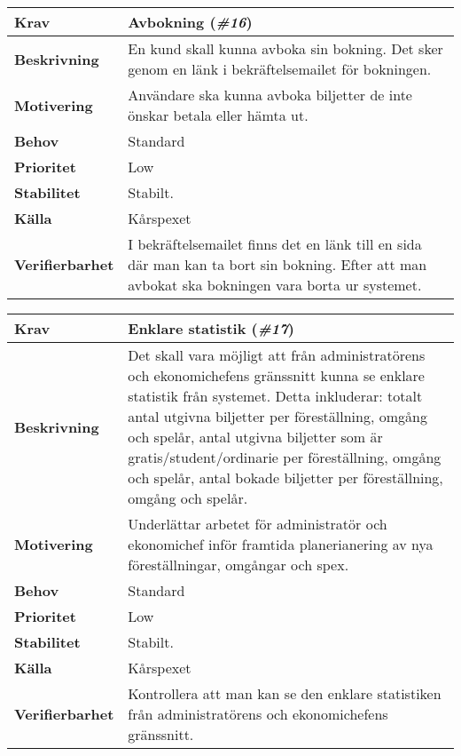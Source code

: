 \documentclass[a4paper, twoside, 11pt, titlepage]{article}
\begin{document}
	\begin{tabular} { p{2.6cm} p{12.5cm} }
		\hline
		\sffamily\textbf{Krav} & Avbokning (\emph{\#16})  \\
		\hline
		\sffamily\textbf{Beskrivning} & En kund skall kunna avboka sin bokning. Det sker genom en länk i bekräftelsemailet för bokningen.  \\
		\hline
		\sffamily\textbf{Motivering} & Användare ska kunna avboka biljetter de inte önskar betala eller hämta ut.  \\
		\hline
		\sffamily\textbf{Behov} & Standard  \\
		\hline
		\sffamily\textbf{Prioritet} & Low  \\
		\hline
		\sffamily\textbf{Stabilitet} & Stabilt.  \\
		\hline
		\sffamily\textbf{Källa} & Kårspexet  \\
		\hline
		\sffamily\textbf{Verifierbarhet} & I bekräftelsemailet finns det en länk till en sida där man kan ta bort sin bokning. Efter att man avbokat ska bokningen vara borta ur systemet.  \\
		\hline
	\end{tabular}
	\vspace{6mm}

	\begin{tabular} { p{2.6cm} p{12.5cm} }
		\hline
		\sffamily\textbf{Krav} & Enklare statistik  (\emph{\#17})  \\
		\hline
		\sffamily\textbf{Beskrivning} & Det skall vara möjligt att från administratörens och ekonomichefens gränssnitt kunna se enklare statistik från systemet. Detta inkluderar: totalt antal utgivna biljetter per föreställning, omgång och spelår, antal utgivna biljetter som är gratis/student/ordinarie per föreställning, omgång och spelår, antal bokade biljetter per föreställning, omgång och spelår.   \\
		\hline
		\sffamily\textbf{Motivering} & Underlättar arbetet för administratör och ekonomichef inför framtida planerianering av nya föreställningar, omgångar och spex.  \\
		\hline
		\sffamily\textbf{Behov} & Standard  \\
		\hline
		\sffamily\textbf{Prioritet} & Low  \\
		\hline
		\sffamily\textbf{Stabilitet} & Stabilt.  \\
		\hline
		\sffamily\textbf{Källa} & Kårspexet  \\
		\hline
		\sffamily\textbf{Verifierbarhet} & Kontrollera att man kan se den enklare statistiken från administratörens och ekonomichefens gränssnitt.  \\
		\hline
	\end{tabular}
	\vspace{6mm}
\end{document}
